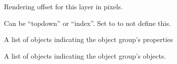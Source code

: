 \documentclass[letterpaper,10pt,english]{sphinxmanual}
\begin{document}
\begin{fulllineitems}
\begin{fulllineitems}
\label{index:tmx.ObjectGroup.offsety}
Rendering offset for this layer in pixels.

\end{fulllineitems}


\begin{fulllineitems}
\label{index:tmx.ObjectGroup.draworder}
Can be ``topdown'' or ``index''.  Set to  to not define
this.

\end{fulllineitems}


\begin{fulllineitems}
\label{index:tmx.ObjectGroup.properties}
A list of {\hyperref[index:tmx.Property]{\emph{}}} objects indicating the object group's
properties

\end{fulllineitems}



\begin{fulllineitems}
A list of {\hyperref[index:tmx.Object]{\emph{}}} objects indicating the object group's
objects.

\end{fulllineitems}


\end{fulllineitems}

\end{document}
